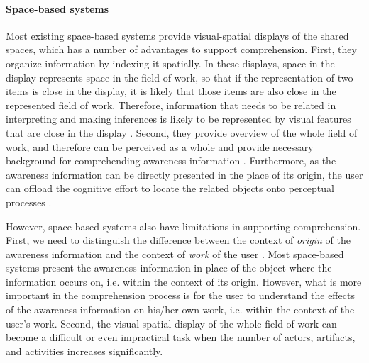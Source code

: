 \paragraph*{Space-based systems} %
\label{par:space_based_systems}
Most existing space-based systems provide visual-spatial displays \cite{Hegarty2011} of the shared spaces, which has a number of advantages to support comprehension. First, they organize information by indexing it spatially. In these displays, space in the display represents space in the field of work, so that if the representation of two items is close in the display, it is likely that those items are also close in the represented field of work. Therefore, information that needs to be related in interpreting and making inferences is likely to be represented by visual features that are close in the display \cite{Hegarty2011}. Second, they provide overview of the whole field of work, and therefore can be perceived as a whole and provide necessary background for comprehending awareness information \cite{Berlage1999}. Furthermore, as the awareness information can be directly presented in the place of its origin, the user can offload the cognitive effort to locate the related objects onto perceptual processes \cite{M.1996}.

However, space-based systems also have limitations in supporting comprehension. First, we need to distinguish the difference between the context of \emph{origin} of the awareness information and the context of \emph{work} of the user \cite{Gross2004}. Most space-based systems present the awareness information in place of the object where the information occurs on, i.e. within the context of its origin. However, what is more important in the comprehension process is for the user to understand the effects of the awareness information on his/her own work, i.e. within the context of the user's work. Second, the visual-spatial display of the whole field of work can become a difficult or even impractical task when the number of actors, artifacts, and activities increases significantly. 

